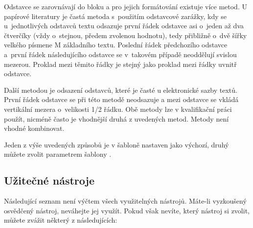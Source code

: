 Odstavce se zarovnávají do bloku a pro jejich formátování existuje více metod. U papírové literatury je častá metoda s~použitím odstavcové zarážky, kdy se u~jednotlivých odstavců textu odsazuje první řádek odstavce asi o~jeden až dva čtverčíky (vždy o~stejnou, předem zvolenou hodnotu), tedy přibližně o~dvě šířky velkého písmene M základního textu. Poslední řádek předchozího odstavce a~první řádek následujícího odstavce se v~takovém případě neoddělují svislou mezerou. Proklad mezi těmito řádky je stejný jako proklad mezi řádky uvnitř odstavce. \cite{fitWeb}

Další metodou je odsazení odstavců, které je časté u elektronické sazby textů. První řádek odstavce se při této metodě neodsazuje a mezi odstavce se vkládá vertikální mezera o~velikosti 1/2 řádku. Obě metody lze v kvalifikační práci použít, nicméně často je vhodnější druhá z uvedených metod. Metody není vhodné kombinovat.

Jeden z výše uvedených způsobů je v šabloně nastaven jako výchozí, druhý můžete zvolit parametrem šablony .

\subsection*{Užitečné nástroje}
\label{nastroje}

Následující seznam není výčtem všech využitelných nástrojů. Máte-li vyzkoušený osvědčený nástroj, neváhejte jej využít. Pokud však nevíte, který nástroj si zvolit, můžete zvážit některý z následujících:


